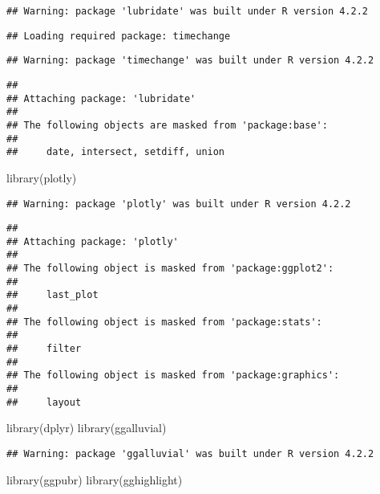 \documentclass[
]{article}
\newenvironment{Shaded}{\begin{snugshade}}{\end{snugshade}}
\newcommand{\FunctionTok}[1]{\textcolor[rgb]{0.00,0.00,0.00}{#1}}
\newcommand{\NormalTok}[1]{#1}
\begin{document}
\begin{verbatim}
## Warning: package 'lubridate' was built under R version 4.2.2
\end{verbatim}

\begin{verbatim}
## Loading required package: timechange
\end{verbatim}

\begin{verbatim}
## Warning: package 'timechange' was built under R version 4.2.2
\end{verbatim}

\begin{verbatim}
## 
## Attaching package: 'lubridate'
## 
## The following objects are masked from 'package:base':
## 
##     date, intersect, setdiff, union
\end{verbatim}

\begin{Shaded}
\begin{Highlighting}[]
  \FunctionTok{library}\NormalTok{(plotly)}
\end{Highlighting}
\end{Shaded}

\begin{verbatim}
## Warning: package 'plotly' was built under R version 4.2.2
\end{verbatim}

\begin{verbatim}
## 
## Attaching package: 'plotly'
## 
## The following object is masked from 'package:ggplot2':
## 
##     last_plot
## 
## The following object is masked from 'package:stats':
## 
##     filter
## 
## The following object is masked from 'package:graphics':
## 
##     layout
\end{verbatim}

\begin{Shaded}
\begin{Highlighting}[]
  \FunctionTok{library}\NormalTok{(dplyr)}
  \FunctionTok{library}\NormalTok{(ggalluvial)}
\end{Highlighting}
\end{Shaded}

\begin{verbatim}
## Warning: package 'ggalluvial' was built under R version 4.2.2
\end{verbatim}

\begin{Shaded}
\begin{Highlighting}[]
  \FunctionTok{library}\NormalTok{(ggpubr)}
  \FunctionTok{library}\NormalTok{(gghighlight)}
\end{Highlighting}
\end{Shaded}
\end{document}
